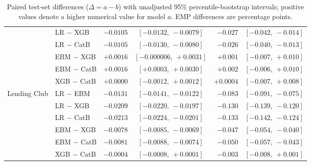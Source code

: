 \begin{table}[!t]
\begin{tabular}{@{}llrcrc@{}}
                 & LR $-$ XGB   & $-0.0105$ & $[-0.0132,\ -0.0079]$   & $-0.027$  & $[-0.042,\ -0.014]$ \\
                 & LR $-$ CatB  & $-0.0105$ & $[-0.0130,\ -0.0080]$   & $-0.026$  & $[-0.040,\ -0.013]$ \\
                 & EBM $-$ XGB  & $+0.0016$ & $[-0.000006,\ +0.0031]$ & $+0.001$  & $[-0.007,\ +0.010]$ \\
                 & EBM $-$ CatB & $+0.0016$ & $[+0.0003,\ +0.0030]$   & $+0.002$  & $[-0.006,\ +0.010]$ \\
                 & XGB $-$ CatB & $+0.0000$ & $[-0.0012,\ +0.0012]$   & $+0.0004$ & $[-0.007,\ +0.008]$ \\
\midrule
Lending Club     & LR $-$ EBM   & $-0.0131$ & $[-0.0141,\ -0.0122]$   & $-0.083$  & $[-0.091,\ -0.075]$ \\
                 & LR $-$ XGB   & $-0.0209$ & $[-0.0220,\ -0.0197]$   & $-0.130$  & $[-0.139,\ -0.120]$ \\
                 & LR $-$ CatB  & $-0.0213$ & $[-0.0224,\ -0.0201]$   & $-0.133$  & $[-0.142,\ -0.124]$ \\
                 & EBM $-$ XGB  & $-0.0078$ & $[-0.0085,\ -0.0069]$   & $-0.047$  & $[-0.054,\ -0.040]$ \\
                 & EBM $-$ CatB & $-0.0081$ & $[-0.0088,\ -0.0074]$   & $-0.050$  & $[-0.057,\ -0.043]$ \\
                 & XGB $-$ CatB & $-0.0004$ & $[-0.0008,\ +0.0001]$   & $-0.003$  & $[-0.008,\ +0.001]$ \\
\bottomrule
\end{tabular}
\caption[Paired differences in ROC-AUC and EMP]{Paired test-set differences
  ($\Delta=a-b$) with unadjusted 95\% percentile-bootstrap intervals; positive values
  denote a higher numerical value for model $a$. EMP differences are percentage points.}
\label{tab:delta_pairs}
\end{table}

